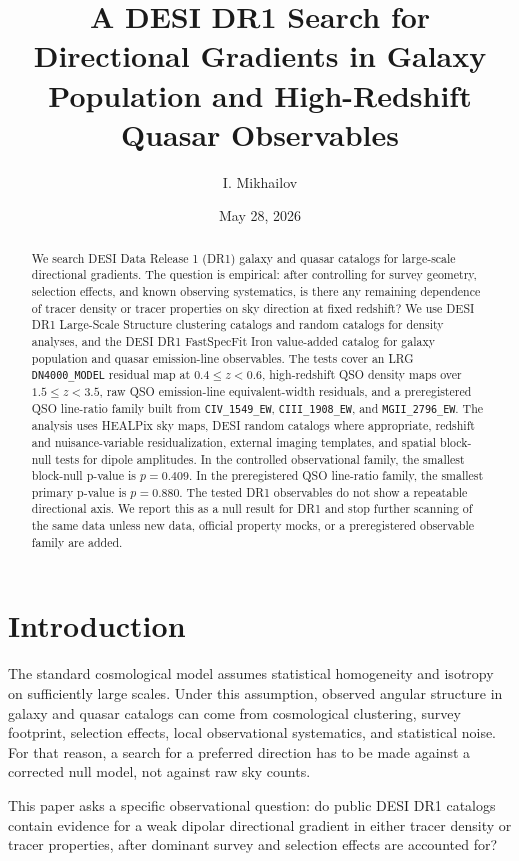 \documentclass[11pt]{article}
\title{A DESI DR1 Search for Directional Gradients in Galaxy Population and High-Redshift Quasar Observables}
\author{I. Mikhailov}
\affil{Independent Researcher, Moscow, Russia}
\date{May 28, 2026}
\begin{document}
\maketitle

\begin{abstract}
We search DESI Data Release 1 (DR1) galaxy and quasar catalogs for large-scale directional gradients. The question is empirical: after controlling for survey geometry, selection effects, and known observing systematics, is there any remaining dependence of tracer density or tracer properties on sky direction at fixed redshift? We use DESI DR1 Large-Scale Structure clustering catalogs and random catalogs for density analyses, and the DESI DR1 FastSpecFit Iron value-added catalog for galaxy population and quasar emission-line observables. The tests cover an LRG \texttt{DN4000\_MODEL} residual map at $0.4 \le z < 0.6$, high-redshift QSO density maps over $1.5 \le z < 3.5$, raw QSO emission-line equivalent-width residuals, and a preregistered QSO line-ratio family built from \texttt{CIV\_1549\_EW}, \texttt{CIII\_1908\_EW}, and \texttt{MGII\_2796\_EW}. The analysis uses HEALPix sky maps, DESI random catalogs where appropriate, redshift and nuisance-variable residualization, external imaging templates, and spatial block-null tests for dipole amplitudes. In the controlled observational family, the smallest block-null p-value is $p=0.409$. In the preregistered QSO line-ratio family, the smallest primary p-value is $p=0.880$. The tested DR1 observables do not show a repeatable directional axis. We report this as a null result for DR1 and stop further scanning of the same data unless new data, official property mocks, or a preregistered observable family are added.
\end{abstract}

\section{Introduction}

The standard cosmological model assumes statistical homogeneity and isotropy on sufficiently large scales. Under this assumption, observed angular structure in galaxy and quasar catalogs can come from cosmological clustering, survey footprint, selection effects, local observational systematics, and statistical noise. For that reason, a search for a preferred direction has to be made against a corrected null model, not against raw sky counts.

This paper asks a specific observational question: do public DESI DR1 catalogs contain evidence for a weak dipolar directional gradient in either tracer density or tracer properties, after dominant survey and selection effects are accounted for?
\end{document}
